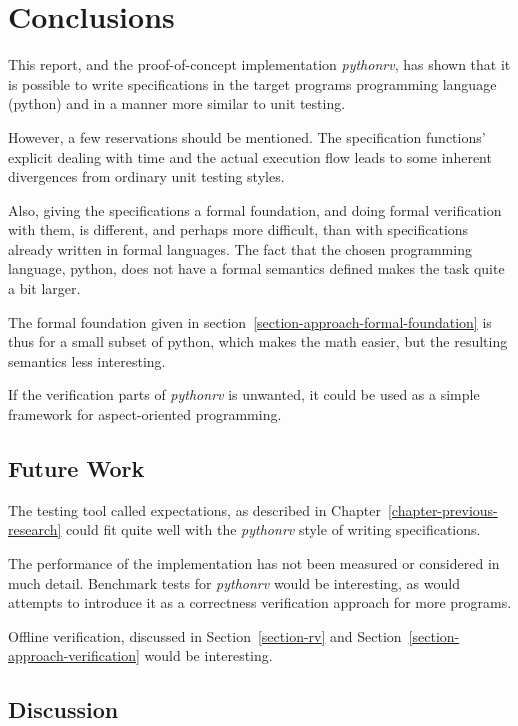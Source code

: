 \documentclass[a4paper,11pt]{kth-mag}
\begin{document}
\pagestyle{newchap}
\chapter{Conclusions} \label{chapter-conclusions}

This report, and the proof-of-concept implementation \textit{pythonrv}, has
shown that it is possible to write specifications in the target programs
programming language (python) and in a manner more similar to unit testing.

However, a few reservations should be mentioned. The specification functions'
explicit dealing with time and the actual execution flow leads to some inherent
divergences from ordinary unit testing styles.

Also, giving the specifications a formal foundation, and doing formal
verification with them, is different, and perhaps more difficult, than with
specifications already written in formal languages. The fact that the chosen
programming language, python, does not have a formal semantics defined makes the
task quite a bit larger.

The formal foundation given in section~\ref{section-approach-formal-foundation}
is thus for a small subset of python, which makes the math easier, but the
resulting semantics less interesting.

If the verification parts of \textit{pythonrv} is unwanted, it could be used as
a simple framework for aspect-oriented programming.

\section{Future Work}

The testing tool called expectations, as described in
Chapter~\ref{chapter-previous-research} could fit quite well with the
\textit{pythonrv} style of writing specifications.

The performance of the implementation has not been measured or considered in
much detail. Benchmark tests for \textit{pythonrv} would be interesting, as
would attempts to introduce it as a correctness verification approach for more
programs.

Offline verification, discussed in Section~\ref{section-rv} and
Section~\ref{section-approach-verification} would be interesting.

\section{Discussion}
\end{document}
